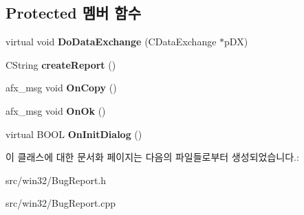 \subsection*{Protected 멤버 함수}
\begin{DoxyCompactItemize}
\item 
\mbox{\label{class_bug_report_a5b019306aeca9497b7b6efd438a44558}} 
virtual void {\bfseries Do\+Data\+Exchange} (C\+Data\+Exchange $\ast$p\+DX)
\item 
\mbox{\label{class_bug_report_afe00e8dd3efa190199d8d645cb702e07}} 
C\+String {\bfseries create\+Report} ()
\item 
\mbox{\label{class_bug_report_a6b74689c7cf7ed6daeaaf2dc8f1498ab}} 
afx\+\_\+msg void {\bfseries On\+Copy} ()
\item 
\mbox{\label{class_bug_report_a2c9a7f1da33a46ca97f0ecd821e701e9}} 
afx\+\_\+msg void {\bfseries On\+Ok} ()
\item 
\mbox{\label{class_bug_report_abcfc2e192747272d1708a1d479bfd45b}} 
virtual B\+O\+OL {\bfseries On\+Init\+Dialog} ()
\end{DoxyCompactItemize}


이 클래스에 대한 문서화 페이지는 다음의 파일들로부터 생성되었습니다.\+:\begin{DoxyCompactItemize}
\item 
src/win32/Bug\+Report.\+h\item 
src/win32/Bug\+Report.\+cpp\end{DoxyCompactItemize}
